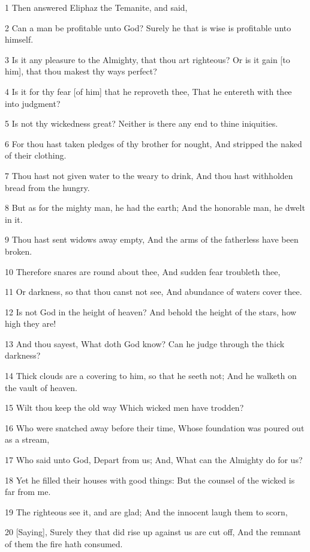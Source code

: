 \par 1 Then answered Eliphaz the Temanite, and said,
\par 2 Can a man be profitable unto God? Surely he that is wise is profitable unto himself.
\par 3 Is it any pleasure to the Almighty, that thou art righteous? Or is it gain [to him], that thou makest thy ways perfect?
\par 4 Is it for thy fear [of him] that he reproveth thee, That he entereth with thee into judgment?
\par 5 Is not thy wickedness great? Neither is there any end to thine iniquities.
\par 6 For thou hast taken pledges of thy brother for nought, And stripped the naked of their clothing.
\par 7 Thou hast not given water to the weary to drink, And thou hast withholden bread from the hungry.
\par 8 But as for the mighty man, he had the earth; And the honorable man, he dwelt in it.
\par 9 Thou hast sent widows away empty, And the arms of the fatherless have been broken.
\par 10 Therefore snares are round about thee, And sudden fear troubleth thee,
\par 11 Or darkness, so that thou canst not see, And abundance of waters cover thee.
\par 12 Is not God in the height of heaven? And behold the height of the stars, how high they are!
\par 13 And thou sayest, What doth God know? Can he judge through the thick darkness?
\par 14 Thick clouds are a covering to him, so that he seeth not; And he walketh on the vault of heaven.
\par 15 Wilt thou keep the old way Which wicked men have trodden?
\par 16 Who were snatched away before their time, Whose foundation was poured out as a stream,
\par 17 Who said unto God, Depart from us; And, What can the Almighty do for us?
\par 18 Yet he filled their houses with good things: But the counsel of the wicked is far from me.
\par 19 The righteous see it, and are glad; And the innocent laugh them to scorn,
\par 20 [Saying], Surely they that did rise up against us are cut off, And the remnant of them the fire hath consumed.
